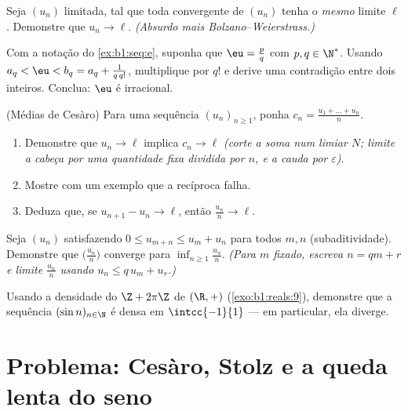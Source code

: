 \begin{exercise}[$\star\star$]\label{exo:b1:seq:8}
Seja $(u_n)$ limitada, tal que toda  convergente de
$(u_n)$ tenha o \emph{mesmo} limite $\ell$. Demonstre que $u_n \to \ell$.
\emph{(Absurdo mais Bolzano--Weierstrass.)}
\end{exercise}

\begin{exercise}[$\star\star\star$]\label{exo:b1:seq:9}
Com a notação do \cref{ex:b1:seq:e}, suponha que $\eu = \frac pq$
com $p, q \in \N^*$. Usando $a_q < \eu < b_q = a_q + \frac{1}{q\,
q!}$, multiplique por $q!$ e derive uma contradição entre dois
inteiros. Conclua: $\eu$ é irracional.
\end{exercise}

\begin{exercise}[$\star\star\star$]\label{exo:b1:seq:10}
(Médias de Cesàro) Para uma sequência $(u_n)_{n \geq 1}$, ponha $c_n =
\frac{u_1 + \dots + u_n}{n}$.
\begin{enumerate}
  \item Demonstre que $u_n \to \ell$ implica $c_n \to \ell$ \emph{(corte
        a soma num limiar $N$; limite a cabeça por uma quantidade fixa
        dividida por $n$, e a cauda por $\varepsilon$)}.
  \item Mostre com um exemplo que a recíproca falha.
  \item Deduza que, se $u_{n+1} - u_n \to \ell$, então $\frac{u_n}{n}
        \to \ell$.
\end{enumerate}
\end{exercise}

\begin{exercise}[$\star\star\star$]\label{exo:b1:seq:11}
Seja $(u_n)$ satisfazendo $0 \leq u_{m+n} \leq u_m + u_n$ para todos $m, n$
(subaditividade). Demonstre que $\bigl(\frac{u_n}{n}\bigr)$ converge para
$\inf_{n \geq 1} \frac{u_n}{n}$. \emph{(Para $m$ fixado, escreva $n = qm
+ r$ e limite $\frac{u_n}{n}$ usando $u_n \leq q\,u_m + u_r$.)}
\end{exercise}

\begin{exercise}[$\star\star\star$]\label{exo:b1:seq:12}
Usando a densidade do  $\Z + 2\pi\Z$ de $(\R, +)$
(\cref{exo:b1:reals:9}), demonstre que a sequência $(\sin n)_{n \in
\N}$ é densa em $\intcc{-1}{1}$ --- em particular, ela diverge.
\end{exercise}

\section{Problema: Cesàro, Stolz e a queda lenta do seno}

